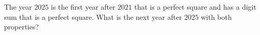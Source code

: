 The year $2025$ is the first year after $2021$ that is a perfect square and has a digit sum that is a perfect square. What is the next year after $2025$ with both properties?
